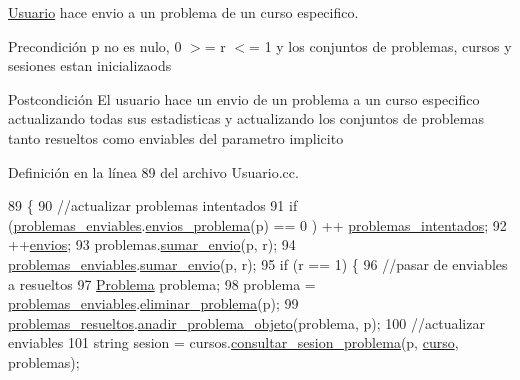 \mbox{\hyperlink{class_usuario}{Usuario}} hace envio a un problema de un curso especifico. 

\begin{DoxyPrecond}{Precondición}
p no es nulo, 0 $>$= r $<$= 1 y los conjuntos de problemas, cursos y sesiones estan inicializaods 
\end{DoxyPrecond}
\begin{DoxyPostcond}{Postcondición}
El usuario hace un envio de un problema a un curso especifico actualizando todas sus estadisticas y actualizando los conjuntos de problemas tanto resueltos como enviables del parametro implicito 
\end{DoxyPostcond}


Definición en la línea 89 del archivo Usuario.\+cc.


\begin{DoxyCode}
89                                                                                                     \{
90     \textcolor{comment}{//actualizar problemas intentados}
91   \textcolor{keywordflow}{if} (\mbox{\hyperlink{class_usuario_a553cef1aad192b30d010cd524f261c1b}{problemas\_enviables}}.\mbox{\hyperlink{class_cjt__problema_a8d153df869b2918083eb9451d3a0ab6a}{envios\_problema}}(p) ==  0 ) ++
      \mbox{\hyperlink{class_usuario_a5484a08ce9aeabef98074c738f58b00a}{problemas\_intentados}};
92   ++\mbox{\hyperlink{class_usuario_a485a741c0646e6414bd6cf669a77fc9c}{envios}};
93   problemas.\mbox{\hyperlink{class_cjt__problema_a5450799b75298f2b267f3ecce7ba5fb0}{sumar\_envio}}(p, r);
94   \mbox{\hyperlink{class_usuario_a553cef1aad192b30d010cd524f261c1b}{problemas\_enviables}}.\mbox{\hyperlink{class_cjt__problema_a5450799b75298f2b267f3ecce7ba5fb0}{sumar\_envio}}(p, r);
95   \textcolor{keywordflow}{if} (r == 1) \{
96       \textcolor{comment}{//pasar de enviables a resueltos}
97       \mbox{\hyperlink{class_problema}{Problema}} problema;
98       problema = \mbox{\hyperlink{class_usuario_a553cef1aad192b30d010cd524f261c1b}{problemas\_enviables}}.\mbox{\hyperlink{class_cjt__problema_afa2668b9e1a1bc710c29f19512399c58}{eliminar\_problema}}(p);
99       \mbox{\hyperlink{class_usuario_a53fa260ffc780dd5c3a4805d683e5ee7}{problemas\_resueltos}}.\mbox{\hyperlink{class_cjt__problema_ada9dc37cd22fd8065c89ef3f180beac5}{anadir\_problema\_objeto}}(problema, p);
100       \textcolor{comment}{//actualizar enviables}
101       \textcolor{keywordtype}{string} sesion = cursos.\mbox{\hyperlink{class_cjt__curso_a6d9976b271bd773bdff14e79991231e4}{consultar\_sesion\_problema}}(p, 
      \mbox{\hyperlink{class_usuario_aa767fe2d1198f2c97791073bc55803e7}{curso}}, problemas);

\end{DoxyCode}
